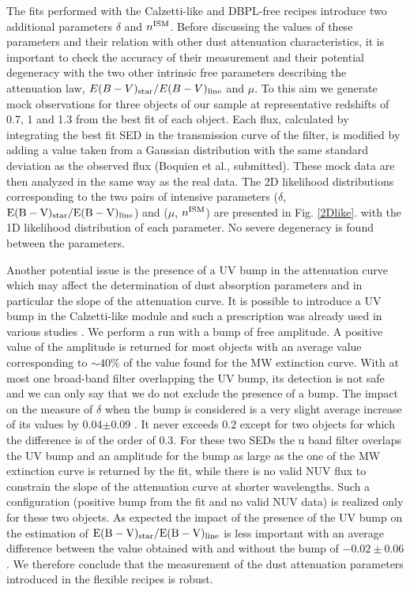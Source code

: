 \documentclass{aa}
\begin{document}
{The fits performed with the Calzetti-like and DBPL-free recipes introduce two  additional parameters $\delta$ and $n^{\rm ISM}$. Before discussing the  values of these parameters and their relation with other dust attenuation characteristics, it is important to check the accuracy of their measurement and their potential degeneracy with the two other intrinsic free parameters describing the attenuation law, $E(B-V)_{\rm star}/E(B-V)_{\rm line}$ and $\mu$. To this aim we generate mock observations for three objects of our sample at representative redshifts of 0.7, 1 and 1.3 from the best fit of each object. Each flux, calculated by integrating the best fit SED  in the  transmission curve of the filter, is modified by adding a value taken from a Gaussian distribution with the same standard deviation as the observed flux (Boquien et al., submitted). These mock data are  then analyzed in the same way as the real data.  The 2D likelihood distributions  corresponding to the two pairs of intensive parameters ($\delta$, $\rm E(B-V)_{star}/E(B-V)_{line}$) and ($\mu$,  $n^{\rm ISM}$) are presented in Fig. \ref{2Dlike}. with the 1D likelihood distribution of each parameter. No severe degeneracy is found between the parameters.

Another potential issue is the presence of a UV bump in the attenuation curve which may affect the determination of  dust absorption parameters and in particular the slope of the attenuation curve.
It is possible to introduce a UV bump in the Calzetti-like module and such a prescription was already used in various studies \citep{Buat12, Kriek13, Zeimann15}. We perform a  run with a bump of free amplitude. A  positive value of the amplitude is returned  for most objects with an average  value corresponding to $\sim 40\%$ of  the value  found for the MW extinction curve. With at most one broad-band filter overlapping the UV bump, its detection is not safe and we can only say that we do not exclude the presence of a bump. The impact on the measure of $\delta$  when the bump is considered is a very slight average increase of its values  by  0.04$\pm 0.09$ . It never exceeds 0.2 except for two objects for which the difference is of the order of 0.3. For these two SEDs the u band filter overlaps the UV bump and  an amplitude for the bump   as large as the one  of the MW extinction curve is returned by the fit,  while  there is  no valid NUV flux to constrain the slope of the attenuation curve at shorter wavelengths. Such a configuration (positive bump from the fit and no valid NUV data) is  realized only for these two objects. As expected the impact of the presence of the UV bump  on the estimation of  $\rm E(B-V)_{star}/E(B-V)_{line}$  is less important with an average difference between the value obtained with and without the bump  of $-0.02\pm 0.06$. We therefore conclude that the measurement of the dust attenuation parameters introduced in the flexible recipes is  robust.}
\end{document}
